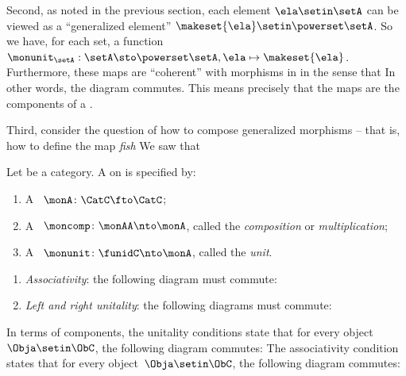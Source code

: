{    Second, as noted in the previous section, each element $\ela \setin \setA$ can be viewed as a ``generalized element'' $\makeset{ \ela } \setin \powerset \setA$.
    So we have, for each set, a function $\monunit_\setA : \setA \sto \powerset \setA, \ela \mapsto \makeset{ \ela }$.
    Furthermore, these maps are ``coherent'' with morphisms in \Set in the sense that \XXX In other words, the diagram \XXX commutes.
    This means precisely that the maps \XXX are the components of a  \XXX .

    Third, consider the question of how to compose generalized morphisms -- that is, how to define the map \emph{fish} \XXX We saw that \XXX
}

\begin{ctdefinition}[Monad]
    \label{def:monad}
    Let \CatC be a category.
    A  on \CatC is specified by:\\
    \constit
    \begin{enumerate}
        \item A ~$ \monA \colon \CatC \fto \CatC$;
        \item A ~$\moncomp \colon \monAA \nto \monA$, called the \emph{composition} or \emph{multiplication};
        \item A ~$\monunit \colon \funidC \nto \monA$, called the \emph{unit}.
    \end{enumerate}
    \condit
    \begin{enumerate}
        \item \emph{Associativity}: the following diagram must commute:
        \item \emph{Left and right unitality}: the following diagrams must commute:
    \end{enumerate}
\end{ctdefinition}

\begin{remark}
    \label{rem:monad-condition-components}
    In terms of components, the unitality conditions state that for every object~$\Obja \setin \ObC$, the following diagram commutes:
    The associativity condition states that for every object~$\Obja \setin \ObC$, the following diagram commutes:
\end{remark}

